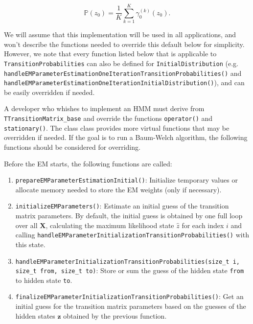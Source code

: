 \documentclass[a4paper,11pt]{article}
\def\X{\boldsymbol{X}}
\def\z{\boldsymbol{z}}
\def\p{\mathbb{P}}
\newcommand{\class}[1]{\texttt{#1}}
\newcommand{\func}[1]{\texttt{#1}}
\newcommand{\pubfunc}[1]{\texttt{#1()}}
\newcommand{\variable}[1]{\texttt{#1}}
\begin{document}
$$
\p(z_0) = \frac{1}{K} \sum_{k=1}^K \gamma_0^{(k)}(z_0).
$$

We will assume that this implementation will be used in all applications, and won't describe the functions needed to override this default below for simplicity. However, we note that every function listed below that is applicable to \variable{TransitionProbabilities} can also be defined for \variable{InitialDistribution} (e.g. \pubfunc{handleEMParameterEstimationOneIterationTransitionProbabilities} and \pubfunc{handleEMParameterEstimationOneIterationInitialDistribution}), and can be easily overridden if needed.

A developer who whishes to implement an HMM must derive from \class{TTransitionMatrix\_base} and override the functions \pubfunc{operator} and \pubfunc{stationary}. The class class provides more virtual functions that may be overridden if needed. If the goal is to run a Baum-Welch algorithm, the following functions should be considered for overriding.

Before the EM starts, the following functions are called:
\begin{enumerate}
 \item \pubfunc{prepareEMParameterEstimationInitial}: Initialize temporary values or allocate memory needed to store the EM weights (only if necessary).
 \item \pubfunc{initializeEMParameters}: Estimate an initial guess of the transition matrix parameters. By default, the initial guess is obtained by one full loop over all $\X$, calculating the maximum likelihood state $\hat{z}$ for each index $i$ and calling  \pubfunc{handleEMParameterInitializationTransitionProbabilities} with this state.
 \item  \func{handleEMParameterInitializationTransitionProbabilities(size\_t i, size\_t from, size\_t to)}: Store or sum the guess of the hidden state \variable{from} to hidden state \variable{to}.
 \item \pubfunc{finalizeEMParameterInitializationTransitionProbabilities}: Get an initial guess for the transition matrix parameters based on the guesses of the hidden states $\z$ obtained by the previous function.
\end{enumerate}
\end{document}
